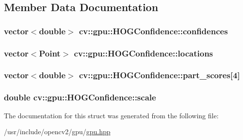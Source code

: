 \subsection{Member Data Documentation}
\hypertarget{structcv_1_1gpu_1_1HOGConfidence_a826ac3c9eb800b4dd0efe393e29262d6}{
\subsubsection[{confidences}]{\setlength{\rightskip}{0pt plus 5cm}vector$<$double$>$ cv\-::gpu\-::\-H\-O\-G\-Confidence\-::confidences}}\label{structcv_1_1gpu_1_1HOGConfidence_a826ac3c9eb800b4dd0efe393e29262d6}
\hypertarget{structcv_1_1gpu_1_1HOGConfidence_abc89125e427cdf2acd7d15643abbf302}{
\subsubsection[{locations}]{\setlength{\rightskip}{0pt plus 5cm}vector$<$Point$>$ cv\-::gpu\-::\-H\-O\-G\-Confidence\-::locations}}\label{structcv_1_1gpu_1_1HOGConfidence_abc89125e427cdf2acd7d15643abbf302}
\hypertarget{structcv_1_1gpu_1_1HOGConfidence_acc690e495cab679ba15a6fa1ab95d142}{
\subsubsection[{part\-\_\-scores}]{\setlength{\rightskip}{0pt plus 5cm}vector$<$double$>$ cv\-::gpu\-::\-H\-O\-G\-Confidence\-::part\-\_\-scores\mbox{[}4\mbox{]}}}\label{structcv_1_1gpu_1_1HOGConfidence_acc690e495cab679ba15a6fa1ab95d142}
\hypertarget{structcv_1_1gpu_1_1HOGConfidence_af738aabee1627811b755e2684c469f0d}{
\subsubsection[{scale}]{\setlength{\rightskip}{0pt plus 5cm}double cv\-::gpu\-::\-H\-O\-G\-Confidence\-::scale}}\label{structcv_1_1gpu_1_1HOGConfidence_af738aabee1627811b755e2684c469f0d}


The documentation for this struct was generated from the following file\-:\begin{DoxyCompactItemize}
\item 
/usr/include/opencv2/gpu/\hyperlink{gpu_2gpu_8hpp}{gpu.\-hpp}\end{DoxyCompactItemize}
